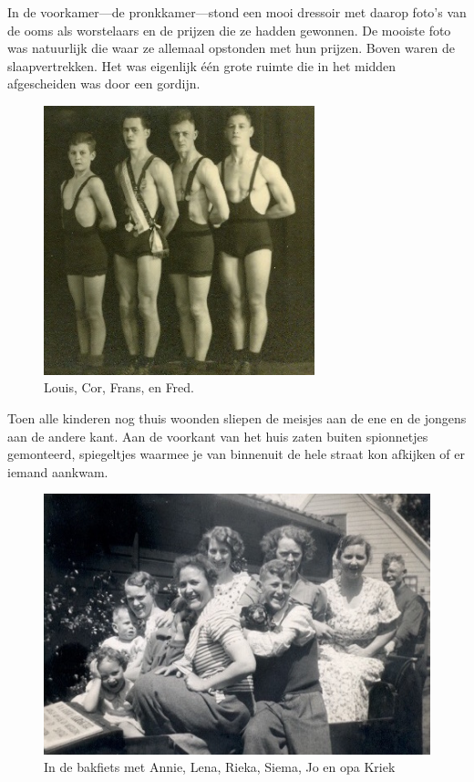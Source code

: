 \documentclass[12pt,twoside, openright]{memoir}
\begin{document}
In de voorkamer---de pronkkamer---stond een mooi dressoir met daarop foto’s van de ooms als worstelaars en de prijzen die ze hadden gewonnen. De mooiste foto was natuurlijk die waar ze allemaal opstonden met hun prijzen. Boven waren de slaapvertrekken. Het was eigenlijk één grote ruimte die in het midden afgescheiden was door een gordijn. 

\begin{figure}
\centering
\includegraphics[width=0.7\textwidth]{img/ch3/Louiscorfransfred}
\caption*{\footnotesize Louis, Cor, Frans, en Fred.}
\end{figure}



Toen alle kinderen nog thuis woonden sliepen de meisjes aan de ene en de jongens aan de andere kant. Aan de voorkant van het huis zaten buiten spionnetjes gemonteerd, spiegeltjes waarmee je van binnenuit de hele straat kon afkijken of er iemand aankwam. 

\begin{figure}
\centering
\includegraphics[width=\textwidth]{img/ch3/indebakfiets}
\caption*{\footnotesize In de bakfiets met Annie, Lena, Rieka, Siema, Jo en opa Kriek}
\end{figure}
\end{document}
